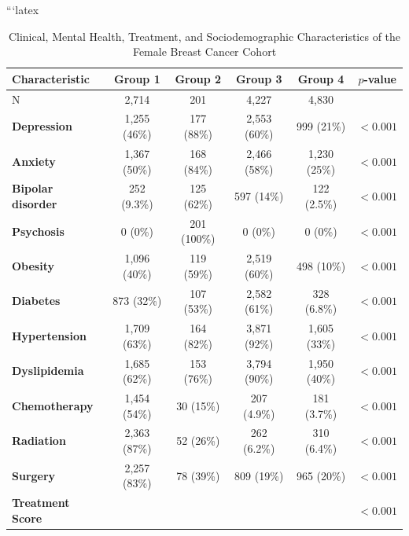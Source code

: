 ```latex
\begin{table}[H]
\centering
\caption{Clinical, Mental Health, Treatment, and Sociodemographic Characteristics of the Female Breast Cancer Cohort}
\label{tab:breast_cancer_characteristics}
\small
\begin{tabular}{lccccc}
\hline
\textbf{Characteristic} &
\textbf{Group 1} &
\textbf{Group 2} &
\textbf{Group 3} &
\textbf{Group 4} &
\textbf{$p$-value} \\
\hline
N & 2,714 & 201 & 4,227 & 4,830 & \\ 
\hline

\textbf{Depression} &
1,255 (46\%) &
177 (88\%) &
2,553 (60\%) &
999 (21\%) &
$<0.001$ \\

\textbf{Anxiety} &
1,367 (50\%) &
168 (84\%) &
2,466 (58\%) &
1,230 (25\%) &
$<0.001$ \\

\textbf{Bipolar disorder} &
252 (9.3\%) &
125 (62\%) &
597 (14\%) &
122 (2.5\%) &
$<0.001$ \\

\textbf{Psychosis} &
0 (0\%) &
201 (100\%) &
0 (0\%) &
0 (0\%) &
$<0.001$ \\

\textbf{Obesity} &
1,096 (40\%) &
119 (59\%) &
2,519 (60\%) &
498 (10\%) &
$<0.001$ \\

\textbf{Diabetes} &
873 (32\%) &
107 (53\%) &
2,582 (61\%) &
328 (6.8\%) &
$<0.001$ \\

\textbf{Hypertension} &
1,709 (63\%) &
164 (82\%) &
3,871 (92\%) &
1,605 (33\%) &
$<0.001$ \\

\textbf{Dyslipidemia} &
1,685 (62\%) &
153 (76\%) &
3,794 (90\%) &
1,950 (40\%) &
$<0.001$ \\

\textbf{Chemotherapy} &
1,454 (54\%) &
30 (15\%) &
207 (4.9\%) &
181 (3.7\%) &
$<0.001$ \\

\textbf{Radiation} &
2,363 (87\%) &
52 (26\%) &
262 (6.2\%) &
310 (6.4\%) &
$<0.001$ \\

\textbf{Surgery} &
2,257 (83\%) &
78 (39\%) &
809 (19\%) &
965 (20\%) &
$<0.001$ \\

\textbf{Treatment Score} & & & & & $<0.001$ \\


\end{tabular}
\end{table}
